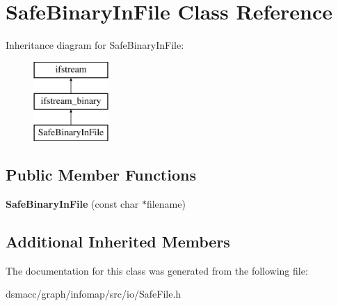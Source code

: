 \hypertarget{classSafeBinaryInFile}{}\section{Safe\+Binary\+In\+File Class Reference}
\label{classSafeBinaryInFile}
Inheritance diagram for Safe\+Binary\+In\+File\+:\begin{figure}[H]
\begin{center}
\leavevmode
\includegraphics[height=3.000000cm]{classSafeBinaryInFile}
\end{center}
\end{figure}
\subsection*{Public Member Functions}
\begin{DoxyCompactItemize}
\item 
\mbox{\label{classSafeBinaryInFile_afdacddc70e57a8c9fa81918ed3542152}} 
{\bfseries Safe\+Binary\+In\+File} (const char $\ast$filename)
\end{DoxyCompactItemize}
\subsection*{Additional Inherited Members}


The documentation for this class was generated from the following file\+:\begin{DoxyCompactItemize}
\item 
dsmacc/graph/infomap/src/io/Safe\+File.\+h\end{DoxyCompactItemize}
